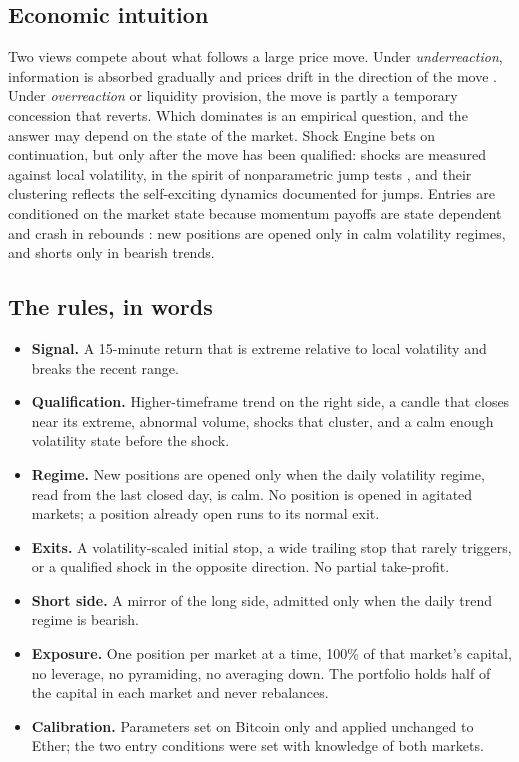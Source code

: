 \documentclass[11pt,a4paper]{article}
\begin{document}
\subsection{Economic intuition}
Two views compete about what follows a large price move. Under \emph{underreaction}, information is absorbed gradually and
prices drift in the direction of the move \citep{hongstein1999}. Under \emph{overreaction} or liquidity provision, the move is
partly a temporary concession that reverts. Which dominates is an empirical question, and the answer may depend on the state of
the market. Shock Engine bets on continuation, but only after the move has been qualified: shocks are measured against local
volatility, in the spirit of nonparametric jump tests \citep{leemykland2008}, and their clustering reflects the self-exciting
dynamics documented for jumps. Entries are conditioned on the market state because momentum payoffs are state dependent and
crash in rebounds \citep{danielmoskowitz2016}: new positions are opened only in calm volatility regimes, and shorts only in
bearish trends.

\subsection{The rules, in words}
\begin{itemize}
\item \textbf{Signal.} A 15-minute return that is extreme relative to local volatility and breaks the recent range.
\item \textbf{Qualification.} Higher-timeframe trend on the right side, a candle that closes near its extreme, abnormal
  volume, shocks that cluster, and a calm enough volatility state before the shock.
\item \textbf{Regime.} New positions are opened only when the daily volatility regime, read from the last closed day, is
  calm. No position is opened in agitated markets; a position already open runs to its normal exit.
\item \textbf{Exits.} A volatility-scaled initial stop, a wide trailing stop that rarely triggers, or a qualified shock in the
  opposite direction. No partial take-profit.
\item \textbf{Short side.} A mirror of the long side, admitted only when the daily trend regime is bearish.
\item \textbf{Exposure.} One position per market at a time, 100\% of that market's capital, no leverage, no pyramiding, no
  averaging down. The portfolio holds half of the capital in each market and never rebalances.
\item \textbf{Calibration.} Parameters set on Bitcoin only and applied unchanged to Ether; the two entry conditions were set
  with knowledge of both markets.
\end{itemize}
\end{document}
